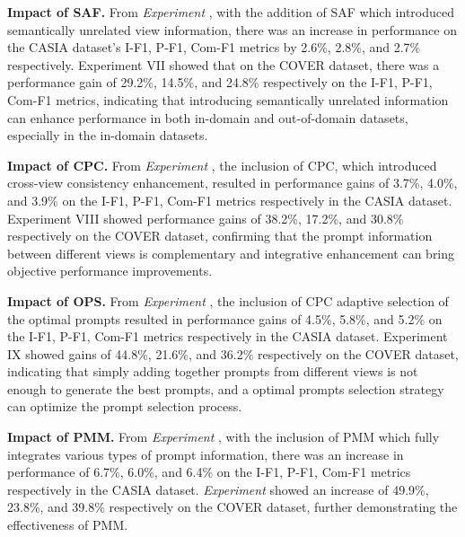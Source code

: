 \noindent\textbf{Impact of SAF.} From \textit{Experiment }, with the addition of SAF which introduced semantically unrelated view information, there was an increase in performance on the CASIA dataset's I-F1, P-F1, Com-F1 metrics by 2.6\%, 2.8\%, and 2.7\% respectively. Experiment VII showed that on the COVER dataset, there was a performance gain of 29.2\%, 14.5\%, and 24.8\% respectively on the I-F1, P-F1, Com-F1 metrics, indicating that introducing semantically unrelated information can enhance performance in both in-domain and out-of-domain datasets, especially in the in-domain datasets.

\noindent\textbf{Impact of CPC.} From \textit{Experiment }, the inclusion of CPC, which introduced cross-view consistency enhancement, resulted in performance gains of 3.7\%, 4.0\%, and 3.9\% on the I-F1, P-F1, Com-F1 metrics respectively in the CASIA dataset. Experiment VIII showed performance gains of 38.2\%, 17.2\%, and 30.8\% respectively on the COVER dataset, confirming that the prompt information between different views is complementary and integrative enhancement can bring objective performance improvements.

\noindent\textbf{Impact of OPS.} From \textit{Experiment }, the inclusion of CPC adaptive selection of the optimal prompts resulted in performance gains of 4.5\%, 5.8\%, and 5.2\% on the I-F1, P-F1, Com-F1 metrics respectively in the CASIA dataset. Experiment IX showed gains of 44.8\%, 21.6\%, and 36.2\% respectively on the COVER dataset, indicating that simply adding together prompts from different views is not enough to generate the best prompts, and a optimal prompts selection strategy can optimize the prompt selection process.

\noindent\textbf{Impact of PMM.} From \textit{Experiment }, with the inclusion of PMM which fully integrates various types of prompt information, there was an increase in performance of 6.7\%, 6.0\%, and 6.4\% on the I-F1, P-F1, Com-F1 metrics respectively in the CASIA dataset. \textit{Experiment } showed an increase of 49.9\%, 23.8\%, and 39.8\% respectively on the COVER dataset, further demonstrating the effectiveness of PMM.













